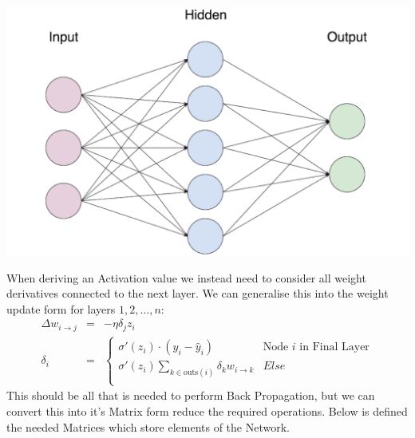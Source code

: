 \begin{flushleft}
                    \centerline{\includegraphics[width=14cm]{Images/InitialResearch/NeuralNetworkExample.png}}

                    When deriving an Activation value we instead need to consider all weight derivatives connected to the next layer. 
                    We can generalise this into the weight update form for layers $1,2, \hdots, n$:
                    \begin{eqnarray*}
                        \Delta w_{i \to j} &=& -\eta\delta_j z_i \\
                        \delta_i &=& 
                        \begin{cases}
                            \sigma'(z_i) \cdot (y_i - \hat{y}_i) & \text{Node $i$ in Final Layer} \\
                            \sigma'(z_i) \sum_{k\in\text{outs}(i)}  \delta_k w_{i \to k} & Else \\
                        \end{cases}
                    \end{eqnarray*}
                    This should be all that is needed to perform Back Propagation, but we can convert this into it's Matrix form reduce the required
                    operations. Below is defined the needed Matrices which store elements of the Network. \\


\end{flushleft}
